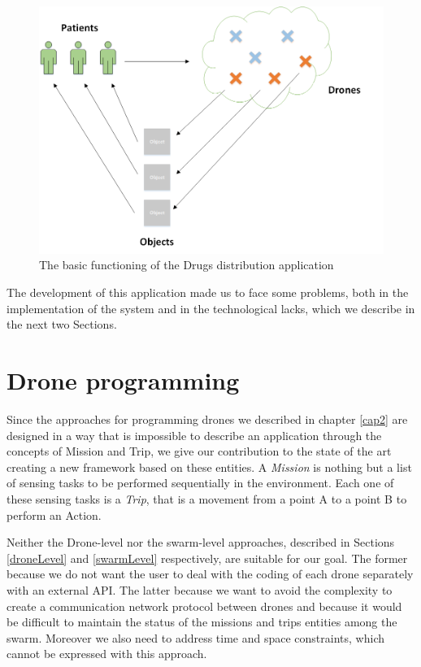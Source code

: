 \begin{figure}[H]
  \centering
  \includegraphics[width=\linewidth]{pictures/DD.png}
  \caption{The basic functioning of the Drugs distribution application}
  \label{fig:motivating}
\end{figure}

The development of this application made us to face some problems, both in the implementation of the system and in the technological lacks, which we describe in the next two Sections.


\section{Drone programming}\label{teamlevelproblems}

Since the approaches for programming drones we described in chapter \ref{cap2} are designed in a way that is impossible to describe an application through the concepts of Mission and Trip, we give our contribution to the state of the art creating a new framework based on these entities.
A \textit{Mission} is nothing but a list of sensing tasks to be performed sequentially in the environment.
Each one of these sensing tasks is a \textit{Trip}, that is a movement from a point A to a point B to perform an Action.

Neither the Drone-level nor the swarm-level approaches, described in Sections \ref{droneLevel} and \ref{swarmLevel} respectively, are suitable for our goal. 
The former because we do not want the user to deal with the coding of each drone separately with an external API.
The latter because we want to avoid the complexity to create a communication network protocol between drones and because it would be difficult to maintain the status of the missions and trips entities among the swarm. Moreover we also need to address  time and space constraints, which cannot be expressed with this approach.
\\

